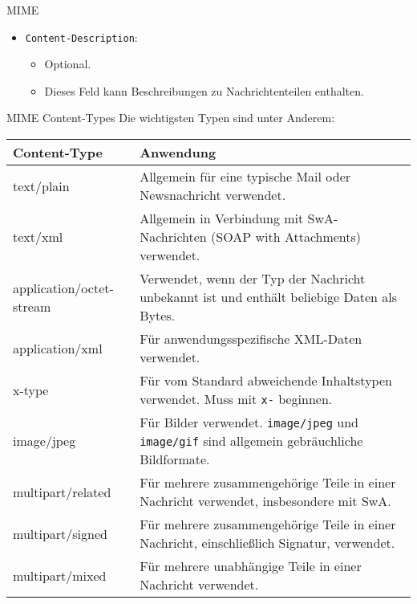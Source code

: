 \begin{defi}{MIME}
\begin{itemize}
\begin{itemize}
              \end{itemize}
        \item \texttt{Content-Description}:
              \begin{itemize}
                  \item Optional.
                  \item Dieses Feld kann Beschreibungen zu Nachrichtenteilen enthalten.
              \end{itemize}
    \end{itemize}
\end{defi}

\begin{defi}{MIME Content-Types}
    Die wichtigsten Typen sind unter Anderem:

    \begin{tabularx}{\textwidth}{|T|X|}
        \hline
        Content-Type             & Anwendung                                                                                                  \\
        \hline
        \hline
        text/plain               & Allgemein für eine typische Mail oder Newsnachricht verwendet.                                             \\
        \hline
        text/xml                 & Allgemein in Verbindung mit SwA-Nachrichten (SOAP with Attachments) verwendet.                             \\
        \hline
        application/octet-stream & Verwendet, wenn der Typ der Nachricht unbekannt ist und enthält beliebige Daten als Bytes.                 \\
        \hline
        application/xml          & Für anwendungsspezifische XML-Daten verwendet.                                                             \\
        \hline
        x-type                   & Für vom Standard abweichende Inhaltstypen verwendet. Muss mit \texttt{x-} beginnen.                        \\
        \hline
        image/jpeg               & Für Bilder verwendet. \texttt{image/jpeg} und \texttt{image/gif} sind allgemein gebräuchliche Bildformate. \\
        \hline
        multipart/related        & Für mehrere zusammengehörige Teile in einer Nachricht verwendet, insbesondere mit SwA.                     \\
        \hline
        multipart/signed         & Für mehrere zusammengehörige Teile in einer Nachricht, einschließlich Signatur, verwendet.                 \\
        \hline
        multipart/mixed          & Für mehrere unabhängige Teile in einer Nachricht verwendet.                                                \\
        \hline
    \end{tabularx}
\end{defi}


